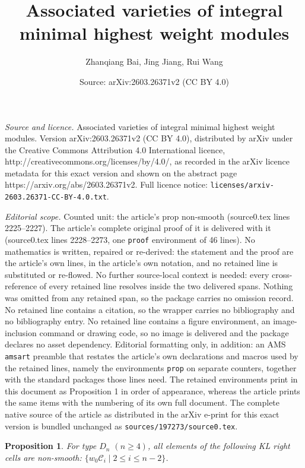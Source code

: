\documentclass[10pt,a4paper]{amsart}
\title{Associated varieties of integral minimal highest weight modules}
\author{Zhanqiang Bai, Jing Jiang, Rui Wang}
\date{Source: arXiv:2603.26371v2 (CC BY 4.0)}
\newtheorem{prop}{Proposition}
\begin{document}
\maketitle

\noindent\emph{Source and licence.} Associated varieties of integral minimal highest weight modules. Version arXiv:2603.26371v2 (CC BY 4.0), distributed by arXiv under the Creative Commons Attribution 4.0 International licence, http://creativecommons.org/licenses/by/4.0/, as recorded in the arXiv licence metadata for this exact version and shown on the abstract page https://arxiv.org/abs/2603.26371v2. Full licence notice: \texttt{licenses/arxiv-2603.26371-CC-BY-4.0.txt}.\par\smallskip

\noindent\textit{Editorial scope.} Counted unit: the article's prop non-smooth (source0.tex lines 2225--2227). The article's complete original proof of it is delivered with it (source0.tex lines 2228--2273, one \texttt{proof} environment of 46 lines). No mathematics is written, repaired or re-derived: the statement and the proof are the article's own lines, in the article's own notation, and no retained line is substituted or re-flowed.  No further source-local context is needed: every cross-reference of every retained line resolves inside the two delivered spans.  Nothing was omitted from any retained span, so the package carries no omission record.  No retained line contains a citation, so the wrapper carries no bibliography and no bibliography entry.  No retained line contains a figure environment, an image-inclusion command or drawing code, so no image is delivered and the package declares no asset dependency.  Editorial formatting only, in addition: an AMS \texttt{amsart} preamble that restates the article's own declarations and macros used by the retained lines, namely the environments \texttt{prop} on separate counters, together with the standard packages those lines need.  The retained environments print in this document as Proposition 1 in order of appearance, whereas the article prints the same items with the numbering of its own full document.  The complete native source of the article as distributed in the arXiv e-print for this exact version is bundled unchanged as \texttt{sources/197273/source0.tex}.
\begin{prop}\label{non-smooth}
    For type $D_n$ $(n\geq 4)$, all elements of the following KL right cells are non-smooth: $\{w_0\mathcal{C}_i\mid 2\leq i \leq n-2\}$.
\end{prop}
\end{document}
